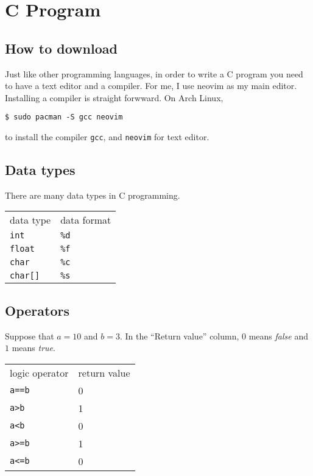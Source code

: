 



\chapter{C Program}
\section{How to download}
Just like other programming languages, in order to write a C program you
need to have a text editor and a compiler. For me, I use neovim
as my main editor. Installing a compiler is straight forwward. 
On Arch Linux, 
\begin{verbatim}
$ sudo pacman -S gcc neovim
\end{verbatim}
to install the compiler \verb|gcc|, and \verb|neovim| for text editor.
\section{Data types}
There are many data types in C programming.
\begin{center}
  \begin{tabular}{ll}
    \toprule
    data type      & data format\\
    \cmidrule(r){1-1} \cmidrule(r){2-2}
    \verb|int|     &   \verb|%d|\\
    \verb|float|   &   \verb|%f|\\
    \verb|char|    &   \verb|%c|\\
    \verb|char[]|  &   \verb|%s|\\
    \bottomrule
  \end{tabular}
\end{center}
\section{Operators}
Suppose that $a=10$ and $b=3$. In the ``Return value'' column,
$0$ means \emph{false} and $1$ means \emph{true}.
\begin{center}
  \begin{tabular}{ll}
    \toprule
    logic operator    &return value\\
    \cmidrule(r){1-1}\cmidrule(l){2-2}
    \verb|a==b|   &0     \\
    \verb|a>b|    &1     \\
    \verb|a<b|    &0     \\
    \verb|a>=b|   &1     \\
    \verb|a<=b|   &0     \\
    \bottomrule
  \end{tabular}
\end{center}
